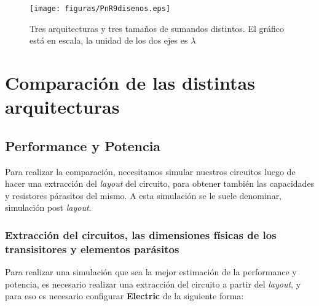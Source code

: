 \begin{figure}
\centering
\texttt{[image: figuras/PnR9disenos.eps]}
  \caption{Tres arquitecturas y tres tamaños de sumandos distintos. El gráfico está en escala, la unidad de los dos ejes es $\lambda$}
  \label{fig:diseños}
\end{figure}

\section{Comparación de las distintas arquitecturas}

\subsection{Performance y Potencia}
Para realizar la comparación, necesitamos simular nuestros circuitos luego de hacer una extracción del \emph{layout} del circuito, para obtener también las capacidades y resistores párasitos del mismo. A esta simulación se le suele denominar, simulación post \emph{layout}.

\subsubsection{Extracción del circuitos, las dimensiones físicas de los transisitores y elementos parásitos}

Para realizar una simulación que sea la mejor estimación de la performance y potencia, es necesario realizar una extracción del circuito a partir del \emph{layout}, y para eso es necesario configurar \textbf{Electric} de la siguiente forma:

